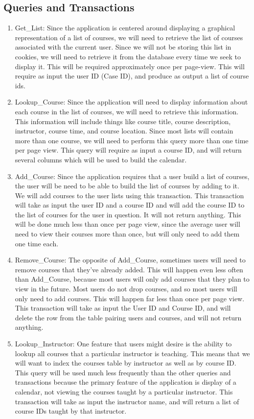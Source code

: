 \documentclass[pdftex,12pt,letter]{article}
\begin{document}
\subsection*{Queries and Transactions}
\begin{enumerate}[1.]
\item Get\_List:  Since the application is centered around displaying a graphical representation of a list of courses, we will need to retrieve the list of courses associated with the current user.  Since we will not be storing this list in cookies, we will need to retrieve it from the database every time we seek to display it.  This will be required approximately once per page-view.  This will require as input the user ID (Case ID), and produce as output a list of course ids.
\item Lookup\_Course:  Since the application will need to display information about each course in the list of courses, we will need to retrieve this information.  This information will include things like course title, course description, instructor, course time, and course location.  Since most lists will contain more than one course, we will need to perform this query more than one time per page view.  This query will require as input a course ID, and will return several columns which will be used to build the calendar.
\item Add\_Course:  Since the application requires that a user build a list of courses, the user will be need to be able to build the list of courses by adding to it.  We will add courses to the user lists using this transaction.  This transaction will take as input the user ID and a course ID and will add the course ID to the list of courses for the user in question.  It will not return anything.  This will be done much less than once per page view, since the average user will need to view their courses more than once, but will only need to add them one time each.
\item Remove\_Course:  The opposite of Add\_Course, sometimes users will need to remove courses that they've already added.  This will happen even less often than Add\_Course, because most users will only add courses that they plan to view in the future.  Most users do not drop courses, and so most users will only need to add courses.  This will happen far less than once per page view.  This transaction will take as input the User ID and Course ID, and will delete the row from the table pairing users and courses, and will not return anything.
\item Lookup\_Instructor:  One feature that users might desire is the ability to lookup all courses that a particular instructor is teaching.  This means that we will want to index the courses table by instructor as well as by course ID.  This query will be used much less frequently than the other queries and transactions because the primary feature of the application is display of a calendar, not viewing the courses taught by a particular instructor.  This transaction will take as input the instructor name, and will return a list of course IDs taught by that instructor.
\end{enumerate}
\end{document}
